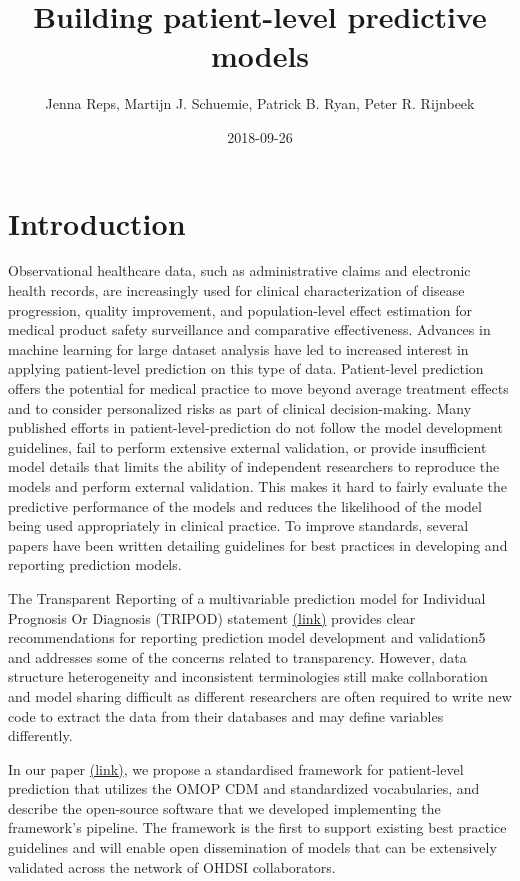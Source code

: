 \documentclass[]{article}
\title{Building patient-level predictive models}
\author{Jenna Reps, Martijn J. Schuemie, Patrick B. Ryan, Peter R. Rijnbeek}
\date{2018-09-26}
\begin{document}
\maketitle

{
\setcounter{tocdepth}{2}
\tableofcontents
}
\section{Introduction}\label{introduction}

Observational healthcare data, such as administrative claims and
electronic health records, are increasingly used for clinical
characterization of disease progression, quality improvement, and
population-level effect estimation for medical product safety
surveillance and comparative effectiveness. Advances in machine learning
for large dataset analysis have led to increased interest in applying
patient-level prediction on this type of data. Patient-level prediction
offers the potential for medical practice to move beyond average
treatment effects and to consider personalized risks as part of clinical
decision-making. Many published efforts in patient-level-prediction do
not follow the model development guidelines, fail to perform extensive
external validation, or provide insufficient model details that limits
the ability of independent researchers to reproduce the models and
perform external validation. This makes it hard to fairly evaluate the
predictive performance of the models and reduces the likelihood of the
model being used appropriately in clinical practice. To improve
standards, several papers have been written detailing guidelines for
best practices in developing and reporting prediction models.

The Transparent Reporting of a multivariable prediction model for
Individual Prognosis Or Diagnosis (TRIPOD) statement
\href{https://www.equator-network.org/reporting-guidelines/tripod-statement/}{(link)}
provides clear recommendations for reporting prediction model
development and validation5 and addresses some of the concerns related
to transparency. However, data structure heterogeneity and inconsistent
terminologies still make collaboration and model sharing difficult as
different researchers are often required to write new code to extract
the data from their databases and may define variables differently.

In our paper
\href{https://academic.oup.com/jamia/article/25/8/969/4989437}{(link)},
we propose a standardised framework for patient-level prediction that
utilizes the OMOP CDM and standardized vocabularies, and describe the
open-source software that we developed implementing the framework's
pipeline. The framework is the first to support existing best practice
guidelines and will enable open dissemination of models that can be
extensively validated across the network of OHDSI collaborators.
\end{document}
